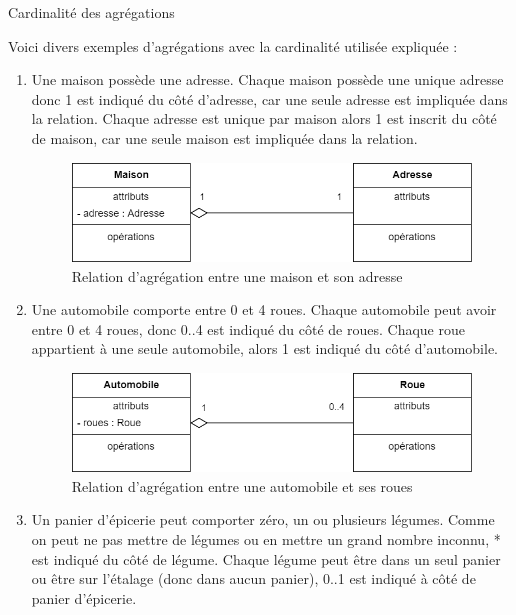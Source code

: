 \begin{exemple}[label = ex:dcc-cardinalite]{Cardinalité des agrégations}
	
	Voici divers exemples d'agrégations avec la cardinalité utilisée expliquée :
	
	\begin{enumerate}
		\item Une maison possède une adresse. Chaque maison possède une unique adresse donc 1 est indiqué du côté d’adresse, car une seule adresse est impliquée dans la relation. Chaque adresse est unique par maison alors 1 est inscrit du côté de maison, car une seule maison est impliquée dans la relation.
		\begin{figure}[H]
			\caption{Relation d'agrégation entre une maison et son adresse}
			\centering
			\includegraphics[scale=0.4]{dcc-exemples-agregation-1.png}
		\end{figure}
		
		\item Une automobile comporte entre 0 et 4 roues. Chaque automobile peut avoir entre 0 et 4 roues, donc 0..4 est indiqué du côté de roues. Chaque roue appartient à une seule automobile, alors 1 est indiqué du côté d'automobile.
		
		\begin{figure}[H]
			\caption{Relation d'agrégation entre une automobile et ses roues}
			\centering
			\includegraphics[scale=0.4]{dcc-exemples-agregation-2.png}
		\end{figure}
		
		\item Un panier d'épicerie peut comporter zéro, un ou plusieurs légumes. Comme on peut ne pas mettre de légumes ou en mettre un grand nombre inconnu, * est indiqué du côté de légume. Chaque légume peut être dans un seul panier ou être sur l'étalage (donc dans aucun panier), 0..1 est indiqué à côté de panier d'épicerie.
		

\end{enumerate}
\end{exemple}
